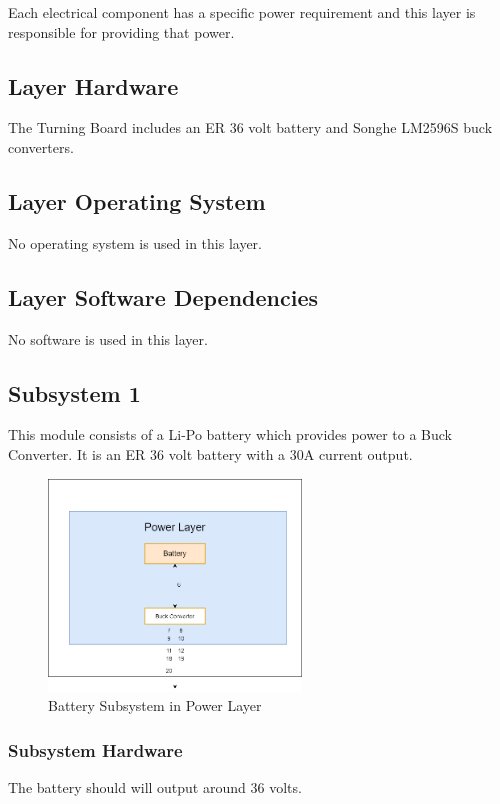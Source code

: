 Each electrical component has a specific power requirement and this layer is responsible for providing that power.

\subsection{Layer Hardware}
The Turning Board includes an ER 36 volt battery and Songhe LM2596S buck converters. 

\subsection{Layer Operating System}
No operating system is used in this layer.

\subsection{Layer Software Dependencies}
No software is used in this layer.

\subsection{Subsystem 1}
This module consists of a Li-Po battery which provides power to a Buck Converter. It is an ER 36 volt battery with a 30A current output.

\begin{figure}[h!]
	\centering
 	\includegraphics[width=0.60\textwidth]{images/Bat.png} %
 \caption{Battery Subsystem in Power Layer} %
\end{figure}

\subsubsection{Subsystem Hardware}
The battery should will output around 36 volts.

